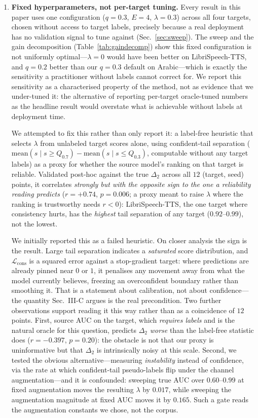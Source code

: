 \documentclass[conference]{IEEEtran}
\begin{document}
\begin{enumerate}
\item \textbf{Fixed hyperparameters, not per-target tuning.} Every result in
this paper uses one configuration ($q{=}0.3$, $E{=}4$, $\lambda{=}0.3$) across
all four targets, chosen without access to target labels, precisely because a
real deployment has no validation signal to tune against
(Sec.~\ref{sec:sweep}). The sweep and the gain decomposition
(Table~\ref{tab:gaindecomp}) show this fixed configuration is not uniformly
optimal---$\lambda{=}0$ would have been better on LibriSpeech-TTS, and
$q{=}0.2$ better than our $q{=}0.3$ default on Arabic---which is exactly the
sensitivity a practitioner without labels cannot correct for. We report this
sensitivity as a characterised property of the method, not as evidence that we
under-tuned it: the alternative of reporting per-target oracle-tuned numbers as
the headline result would overstate what is achievable without labels at
deployment time.

We attempted to fix this rather than only report it: a label-free heuristic
that selects $\lambda$ from unlabeled target scores alone, using
confident-tail separation ($\mathrm{mean}(s\mid s\!\geq\!Q_{0.7}) -
\mathrm{mean}(s\mid s\!\leq\!Q_{0.3})$, computable without any target labels)
as a proxy for whether the source model's ranking on that target is reliable.
Validated post-hoc against the true $\Delta_2$ across all $12$ (target, seed)
points, it correlates \emph{strongly but with the opposite sign to the one a
reliability reading predicts} ($r{=}{+}0.74$, $p{=}0.006$; a proxy meant to
raise $\lambda$ where the ranking is trustworthy needs $r{<}0$):
LibriSpeech-TTS, the one target where consistency hurts, has the \emph{highest}
tail separation of any target ($0.92$--$0.99$), not the lowest.

We initially reported this as a failed heuristic. On closer analysis the sign
is the result. Large tail separation indicates a \emph{saturated} score
distribution, and $\mathcal{L}_{\mathrm{cons}}$ is a squared error against a
stop-gradient target: where predictions are already pinned near $0$ or $1$, it
penalises any movement away from what the model currently believes, freezing an
overconfident boundary rather than smoothing it. That is a statement about
calibration, not about confidence---the quantity Sec.~III-C argues is the real
precondition. Two further observations support reading it this way rather than
as a coincidence of $12$ points. First, source AUC on the target, which
\emph{requires labels} and is the natural oracle for this question, predicts
$\Delta_2$ \emph{worse} than the label-free statistic does ($r{=}{-}0.397$,
$p{=}0.20$): the obstacle is not that our proxy is uninformative but that
$\Delta_2$ is intrinsically noisy at this scale. Second, we tested the obvious
alternative---measuring \emph{instability} instead of confidence, via the rate
at which confident-tail pseudo-labels flip under the channel augmentation---and
it is confounded: sweeping true AUC over $0.60$--$0.99$ at fixed augmentation
moves the resulting $\lambda$ by $0.017$, while sweeping the augmentation
magnitude at fixed AUC moves it by $0.165$. Such a gate reads the augmentation
constants we chose, not the corpus.


\end{enumerate}
\end{document}
